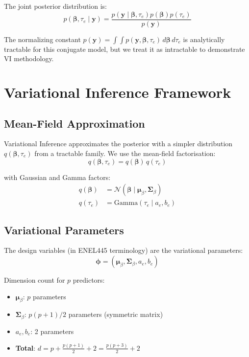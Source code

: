 \documentclass[11pt]{article}
\newcommand{\N}{\mathcal{N}}
\begin{document}
The joint posterior distribution is:
\begin{equation}
p(\bm{\beta}, \tau_e \mid \bm{y}) = \frac{p(\bm{y} \mid \bm{\beta}, \tau_e) p(\bm{\beta}) p(\tau_e)}{p(\bm{y})}
\end{equation}

The normalizing constant $p(\bm{y}) = \int \int p(\bm{y}, \bm{\beta}, \tau_e) \, d\bm{\beta} \, d\tau_e$ is analytically tractable for this conjugate model, but we treat it as intractable to demonstrate VI methodology.

\section{Variational Inference Framework}

\subsection{Mean-Field Approximation}

Variational Inference approximates the posterior with a simpler distribution $q(\bm{\beta}, \tau_e)$ from a tractable family. We use the mean-field factorisation:
\begin{equation}
q(\bm{\beta}, \tau_e) = q(\bm{\beta}) \, q(\tau_e)
\end{equation}

with Gaussian and Gamma factors:
\begin{align}
q(\bm{\beta}) &= \N(\bm{\beta} \mid \bm{\mu}_\beta, \bm{\Sigma}_\beta) \label{eq:q_beta}\\
q(\tau_e) &= \text{Gamma}(\tau_e \mid a_e, b_e) \label{eq:q_tau}
\end{align}

\subsection{Variational Parameters}

The design variables (in ENEL445 terminology) are the variational parameters:
\begin{equation}
\bm{\phi} = (\bm{\mu}_\beta, \bm{\Sigma}_\beta, a_e, b_e)
\end{equation}

Dimension count for $p$ predictors:
\begin{itemize}
\item $\bm{\mu}_\beta$: $p$ parameters
\item $\bm{\Sigma}_\beta$: $p(p+1)/2$ parameters (symmetric matrix)
\item $a_e, b_e$: 2 parameters
\item \textbf{Total}: $d = p + \frac{p(p+1)}{2} + 2 = \frac{p(p+3)}{2} + 2$
\end{itemize}
\end{document}
